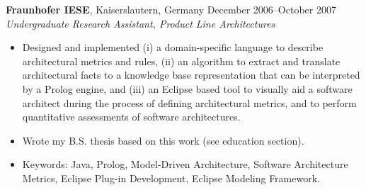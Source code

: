 \documentclass[line,margin]{res}
\begin{document}
\begin{resume}
  \textbf{Fraunhofer IESE}, Kaiserslautern, Germany \hfill December 2006--October 2007\\
  {\sl Undergraduate Research Assistant, Product Line Architectures}
  \begin{itemize}  \itemsep -2pt
  \item Designed and implemented (i) a domain-specific language to describe architectural metrics and rules, (ii) an algorithm to extract and translate architectural facts to a knowledge base representation that can be interpreted by a Prolog engine, and (iii) an Eclipse based tool to visually aid a software architect during the process of defining architectural metrics, and to perform quantitative assessments of software architectures.
  \item Wrote my B.S. thesis based on this work (see education section).
  \item Keywords: Java, Prolog, Model-Driven Architecture, Software Architecture Metrics, Eclipse Plug-in Development, Eclipse Modeling Framework.
  \end{itemize}



\end{resume}
\end{document}

